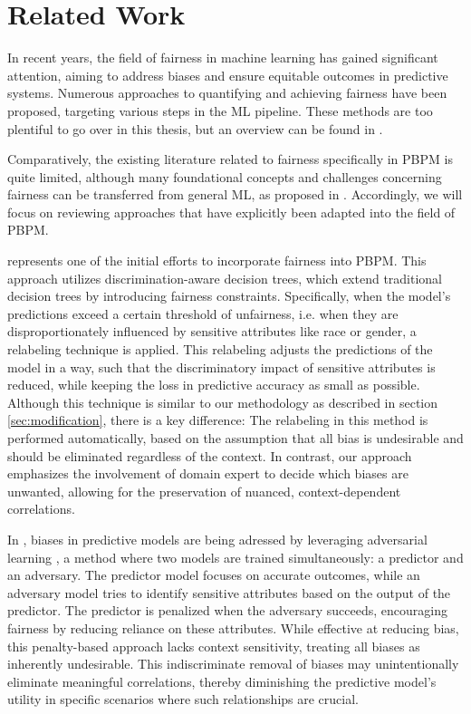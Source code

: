 \chapter{Related Work}
In recent years, the field of fairness in machine learning has gained significant attention,
aiming to address biases and ensure equitable outcomes in predictive systems.
Numerous approaches to quantifying and achieving fairness have been proposed,
targeting various steps in the ML pipeline.
These methods are too plentiful to go over in this thesis,
but an overview can be found in \cite{fairness_ml}.

Comparatively, the existing literature related to fairness specifically in PBPM is quite limited,
although many foundational concepts and challenges concerning fairness can be transferred
from general ML, as proposed in \cite{fairness_overview}.
Accordingly, we will focus on reviewing approaches
that have explicitly been adapted into the field of PBPM.

\cite{fairness_foundation} represents one of the initial efforts to incorporate fairness into PBPM.
This approach utilizes discrimination-aware decision trees,
which extend traditional decision trees by introducing fairness constraints.
Specifically, when the model's predictions exceed a certain threshold of unfairness,
i.e. when they are disproportionately influenced by sensitive attributes like race or gender,
a relabeling technique is applied.
This relabeling adjusts the predictions of the model in a way,
such that the discriminatory impact of sensitive attributes is reduced,
while keeping the loss in predictive accuracy as small as possible.
Although this technique is similar to our methodology as described in section \ref{sec:modification},
there is a key difference:
The relabeling in this method is performed automatically,
based on the assumption that all bias is undesirable and should be eliminated regardless of the context.
In contrast, our approach emphasizes the involvement of domain expert to decide which biases are unwanted,
allowing for the preservation of nuanced, context-dependent correlations.

In \cite{fairness_adversarial},
biases in predictive models are being adressed by leveraging adversarial learning \cite{gan},
a method where two models are trained simultaneously: a predictor and an adversary.
The predictor model focuses on accurate outcomes,
while an adversary model tries to identify sensitive attributes based on the output of the predictor.
The predictor is penalized when the adversary succeeds,
encouraging fairness by reducing reliance on these attributes.
While effective at reducing bias,
this penalty-based approach lacks context sensitivity,
treating all biases as inherently undesirable.
This indiscriminate removal of biases may unintentionally eliminate meaningful correlations,
thereby diminishing the predictive model's utility in specific scenarios
where such relationships are crucial.

